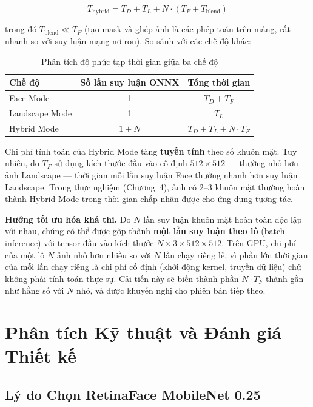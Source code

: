 \begin{equation}
\label{eq:hybrid_time}
T_{\text{hybrid}} = T_D + T_L + N \cdot \left(T_F + T_{\text{blend}}\right)
\end{equation}

\noindent trong đó $T_{\text{blend}} \ll T_F$ (tạo mask và ghép ảnh là các phép toán trên mảng, rất nhanh so với suy luận mạng nơ-ron). So sánh với các chế độ khác:

\begin{table}[H]
\caption{Phân tích độ phức tạp thời gian giữa ba chế độ}
\label{tab:mode_complexity}
\centering
\begin{tabular}{|l|c|c|}
\hline
\textbf{Chế độ} & \textbf{Số lần suy luận ONNX} & \textbf{Tổng thời gian} \\
\hline
Face Mode & 1 & $T_D + T_F$ \\
\hline
Landscape Mode & 1 & $T_L$ \\
\hline
Hybrid Mode & $1 + N$ & $T_D + T_L + N \cdot T_F$ \\
\hline
\end{tabular}
\end{table}

Chi phí tính toán của Hybrid Mode tăng \textbf{tuyến tính} theo số khuôn mặt. Tuy nhiên, do $T_F$ sử dụng kích thước đầu vào cố định $512 \times 512$ --- thường nhỏ hơn ảnh Landscape --- thời gian mỗi lần suy luận Face thường nhanh hơn suy luận Landscape. Trong thực nghiệm (Chương~4), ảnh có 2--3 khuôn mặt thường hoàn thành Hybrid Mode trong thời gian chấp nhận được cho ứng dụng tương tác.

\textbf{Hướng tối ưu hóa khả thi.} Do $N$ lần suy luận khuôn mặt hoàn toàn độc lập với nhau, chúng có thể được gộp thành \textbf{một lần suy luận theo lô} (batch inference) với tensor đầu vào kích thước $N \times 3 \times 512 \times 512$. Trên GPU, chi phí của một lô $N$ ảnh nhỏ hơn nhiều so với $N$ lần chạy riêng lẻ, vì phần lớn thời gian của mỗi lần chạy riêng là chi phí cố định (khởi động kernel, truyền dữ liệu) chứ không phải tính toán thực sự. Cải tiến này sẽ biến thành phần $N \cdot T_F$ thành gần như hằng số với $N$ nhỏ, và được khuyến nghị cho phiên bản tiếp theo.

\section{Phân tích Kỹ thuật và Đánh giá Thiết kế}
\label{sec:fe_analysis}

\subsection{Lý do Chọn RetinaFace MobileNet 0.25}
\label{subsec:why_retinaface}

